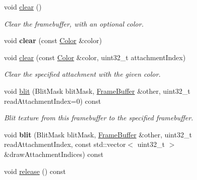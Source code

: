 \begin{Indent}
\begin{DoxyCompactItemize}
\mbox{\label{classrev_1_1_frame_buffer_abc81db9e2a49ae7c123ef325185e8920}} 
void \mbox{\hyperlink{classrev_1_1_frame_buffer_abc81db9e2a49ae7c123ef325185e8920}{clear}} ()
\begin{DoxyCompactList}\small\item\em Clear the framebuffer, with an optional color. \end{DoxyCompactList}\item 
\mbox{\label{classrev_1_1_frame_buffer_ac746509fc1738a7ccaf5f20d3e2e001e}} 
void {\bfseries clear} (const \mbox{\hyperlink{classrev_1_1_color}{Color}} \&color)
\item 
\mbox{\label{classrev_1_1_frame_buffer_af54bef01c95eb39aa843182c8afa0d8d}} 
void \mbox{\hyperlink{classrev_1_1_frame_buffer_af54bef01c95eb39aa843182c8afa0d8d}{clear}} (const \mbox{\hyperlink{classrev_1_1_color}{Color}} \&color, uint32\+\_\+t attachment\+Index)
\begin{DoxyCompactList}\small\item\em Clear the specified attachment with the given color. \end{DoxyCompactList}\item 
void \mbox{\hyperlink{classrev_1_1_frame_buffer_a6853bb65a669c0e263c359a01a32d678}{blit}} (Blit\+Mask blit\+Mask, \mbox{\hyperlink{classrev_1_1_frame_buffer}{Frame\+Buffer}} \&other, uint32\+\_\+t read\+Attachment\+Index=0) const
\begin{DoxyCompactList}\small\item\em Blit texture from this framebuffer to the specified framebuffer. \end{DoxyCompactList}\item 
\mbox{\label{classrev_1_1_frame_buffer_a27c66f40109d2192b1db533e4f35500a}} 
void {\bfseries blit} (Blit\+Mask blit\+Mask, \mbox{\hyperlink{classrev_1_1_frame_buffer}{Frame\+Buffer}} \&other, uint32\+\_\+t read\+Attachment\+Index, const std\+::vector$<$ uint32\+\_\+t $>$ \&draw\+Attachment\+Indices) const
\item 
\mbox{\label{classrev_1_1_frame_buffer_a49d6192ae4f96af83556c511ad01663c}} 
void \mbox{\hyperlink{classrev_1_1_frame_buffer_a49d6192ae4f96af83556c511ad01663c}{release}} () const

\end{DoxyCompactItemize}
\end{Indent}
